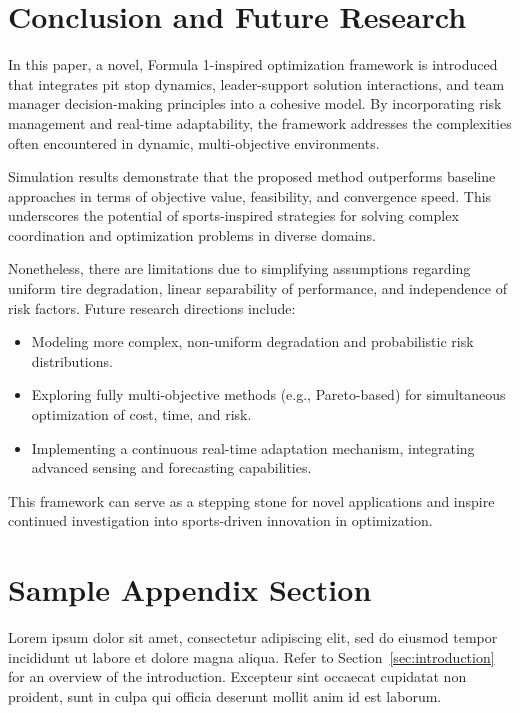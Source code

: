 \documentclass[preprint,12pt]{elsarticle}
\begin{document}
\section{Conclusion and Future Research}
\label{sec:conclusion}

In this paper, a novel, Formula 1-inspired optimization framework is introduced that integrates pit stop dynamics, leader-support solution interactions, and team manager decision-making principles into a cohesive model. By incorporating risk management and real-time adaptability, the framework addresses the complexities often encountered in dynamic, multi-objective environments.

Simulation results demonstrate that the proposed method outperforms baseline approaches in terms of objective value, feasibility, and convergence speed. This underscores the potential of sports-inspired strategies for solving complex coordination and optimization problems in diverse domains.

Nonetheless, there are limitations due to simplifying assumptions regarding uniform tire degradation, linear separability of performance, and independence of risk factors. Future research directions include:
\begin{itemize}
    \item Modeling more complex, non-uniform degradation and probabilistic risk distributions.
    \item Exploring fully multi-objective methods (e.g., Pareto-based) for simultaneous optimization of cost, time, and risk.
    \item Implementing a continuous real-time adaptation mechanism, integrating advanced sensing and forecasting capabilities.
\end{itemize}

This framework can serve as a stepping stone for novel applications and inspire continued investigation into sports-driven innovation in optimization.

\appendix

\section{Sample Appendix Section}
\label{sec:sample:appendix}
Lorem ipsum dolor sit amet, consectetur adipiscing elit, sed do eiusmod tempor incididunt ut labore et dolore magna aliqua. Refer to Section~\ref{sec:introduction} for an overview of the introduction. Excepteur sint occaecat cupidatat non proident, sunt in culpa qui officia deserunt mollit anim id est laborum.
\end{document}
